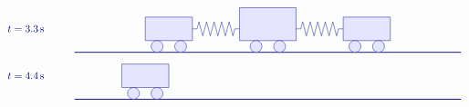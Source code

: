 \begin{solution}
\begin{itemize}
\begin{equation*}
\begin{tikzpicture}[scale=0.8, color=blue!50!black]
\begin{scope}[yshift=-4cm]
        \end{scope}
        \begin{scope}[yshift=-6cm]
          \draw (-3,1) node[right] {$t=3.3\s$};
          \draw[thick] (0,0) -- (16.4,0);
          \begin{scope}[xshift=1cm]
            \draw[fill=blue!10] (2,0.5) rectangle (4,1.5);
            \draw[fill=blue!10] (2.5,0.25) circle (0.25);
            \draw[fill=blue!10] (3.5,0.25) circle (0.25);
          \end{scope}
          \begin{scope}[xshift=5.2cm]
            \draw[fill=blue!10] (1.8,0.5) rectangle (4.2,1.9);
            \draw[fill=blue!10] (2.5,0.25) circle (0.25);
            \draw[fill=blue!10] (3.5,0.25) circle (0.25);
          \end{scope}
          \begin{scope}[xshift=9.4cm]
            \draw[fill=blue!10] (2,0.5) rectangle (4,1.5);
            \draw[fill=blue!10] (2.5,0.25) circle (0.25);
            \draw[fill=blue!10] (3.5,0.25) circle (0.25);
          \end{scope}
          \begin{scope}[xshift=5cm]
            \draw (0,1) -- ++(0.2,0) -- ++(0.08,0.3)
            -- ++(0.16,-0.6) -- ++(0.16,0.6)
            -- ++(0.16,-0.6) -- ++(0.16,0.6)
            -- ++(0.16,-0.6) -- ++(0.16,0.6)
            -- ++(0.16,-0.6) -- ++(0.16,0.6)
            -- ++(0.16,-0.6) -- ++(0.08,0.3)
            -- ++(0.2,0);
          \end{scope}
          \begin{scope}[xshift=9.4cm]
            \draw (0,1) -- ++(0.2,0) -- ++(0.08,0.3)
            -- ++(0.16,-0.6) -- ++(0.16,0.6)
            -- ++(0.16,-0.6) -- ++(0.16,0.6)
            -- ++(0.16,-0.6) -- ++(0.16,0.6)
            -- ++(0.16,-0.6) -- ++(0.16,0.6)
            -- ++(0.16,-0.6) -- ++(0.08,0.3)
            -- ++(0.2,0);
          \end{scope}
        \end{scope}
        \begin{scope}[yshift=-8cm]
          \draw (-3,1) node[right] {$t=4.4\s$};
          \draw[thick] (0,0) -- (16.4,0);
          \begin{scope}[xshift=0cm]
            \draw[fill=blue!10] (2,0.5) rectangle (4,1.5);
            \draw[fill=blue!10] (2.5,0.25) circle (0.25);
            \draw[fill=blue!10] (3.5,0.25) circle (0.25);
          \end{scope}
          \begin{scope}[xshift=5.2cm]

\end{scope}
\end{scope}
\end{tikzpicture}
\end{equation*}
\end{itemize}
\end{solution}
